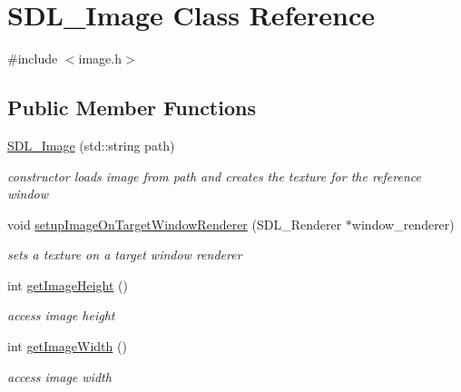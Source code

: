 \hypertarget{class_s_d_l___image}{}\section{S\+D\+L\+\_\+\+Image Class Reference}
\label{class_s_d_l___image}


{\ttfamily \#include $<$image.\+h$>$}

\subsection*{Public Member Functions}
\begin{DoxyCompactItemize}
\item 
\hypertarget{class_s_d_l___image_a521735d1041fa2595a206f5d7c072d8b}{}\label{class_s_d_l___image_a521735d1041fa2595a206f5d7c072d8b} 
\hyperlink{class_s_d_l___image_a521735d1041fa2595a206f5d7c072d8b}{S\+D\+L\+\_\+\+Image} (std\+::string path)
\begin{DoxyCompactList}\small\item\em constructor loads image from path and creates the texture for the reference window \end{DoxyCompactList}\item 
\hypertarget{class_s_d_l___image_accc2a78b16d0f975d792cbde109774af}{}\label{class_s_d_l___image_accc2a78b16d0f975d792cbde109774af} 
void \hyperlink{class_s_d_l___image_accc2a78b16d0f975d792cbde109774af}{setup\+Image\+On\+Target\+Window\+Renderer} (S\+D\+L\+\_\+\+Renderer $\ast$window\+\_\+renderer)
\begin{DoxyCompactList}\small\item\em sets a texture on a target window renderer \end{DoxyCompactList}\item 
\hypertarget{class_s_d_l___image_a1592b3eabac8027430d08ecba955692d}{}\label{class_s_d_l___image_a1592b3eabac8027430d08ecba955692d} 
int \hyperlink{class_s_d_l___image_a1592b3eabac8027430d08ecba955692d}{get\+Image\+Height} ()
\begin{DoxyCompactList}\small\item\em access image height \end{DoxyCompactList}\item 
\hypertarget{class_s_d_l___image_a7d527cce7d8c0f4940df4965772e79af}{}\label{class_s_d_l___image_a7d527cce7d8c0f4940df4965772e79af} 
int \hyperlink{class_s_d_l___image_a7d527cce7d8c0f4940df4965772e79af}{get\+Image\+Width} ()
\begin{DoxyCompactList}\small\item\em access image width \end{DoxyCompactList}\item 

\end{DoxyCompactItemize}
